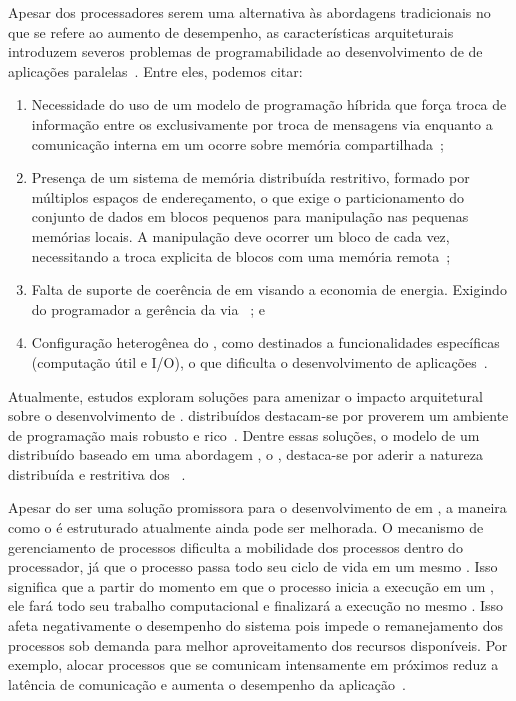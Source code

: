 Apesar dos processadores \lws serem uma alternativa às abordagens tradicionais no que se refere ao aumento de desempenho, as características arquiteturais introduzem severos problemas de programabilidade ao desenvolvimento de \software de aplicações paralelas~\cite{Castro-PARCO:2016}. Entre eles, podemos citar:

\begin{enumerate}[label= (\roman*)]
    \item Necessidade do uso de um modelo de programação híbrida que força troca de informação entre os \clusters exclusivamente por troca de mensagens via \noc enquanto a comunicação interna em um \cluster ocorre sobre memória compartilhada~\cite{kelly2013};
    \item Presença de um sistema de memória distribuída restritivo, formado por múltiplos espaços de endereçamento, o que exige o particionamento do conjunto de dados em blocos pequenos para manipulação nas pequenas memórias locais. A manipulação deve ocorrer um bloco de cada vez, necessitando a troca explicita de blocos com uma memória remota~\cite{Castro-PARCO:2016};
    \item Falta de suporte de coerência de \cache em \hardware visando a economia de energia. Exigindo do programador a gerência da \cache via \software~\cite{francesquini2015}; e
    \item Configuração heterogênea do \hardware, como \clusters destinados a funcionalidades específicas (computação útil e I/O), o que dificulta o desenvolvimento de aplicações~\cite{barbalace2015popcorn}.
\end{enumerate}

Atualmente, estudos exploram soluções para amenizar o impacto arquitetural sobre o desenvolvimento de \software. \oss distribuídos destacam-se por proverem um ambiente de programação mais robusto e rico~\cite{asmussen_m3:_2016, kluge_operating_2014, penna:sbesc19}. Dentre essas soluções, o modelo de um \os distribuído baseado em uma abordagem \multikernel, o \nanvix, destaca-se por aderir a natureza distribuída e restritiva dos \lws~\cite{penna2017-2,penna2019}.

Apesar do \nanvix ser uma solução promissora para o desenvolvimento de \software em \lws, a maneira como o \os é estruturado atualmente ainda pode ser melhorada. O mecanismo de gerenciamento de processos dificulta a mobilidade dos processos dentro do processador, já que o processo passa todo seu ciclo de vida em um mesmo \cluster. Isso significa que a partir do momento em que o processo inicia a execução em um \cluster, ele fará todo seu trabalho computacional e finalizará a execução no mesmo \cluster. Isso afeta negativamente o desempenho do sistema pois impede o remanejamento dos processos sob demanda para melhor aproveitamento dos recursos disponíveis. Por exemplo, alocar processos que se comunicam intensamente em \clusters próximos reduz a latência de comunicação e aumenta o desempenho da aplicação~\cite{vanz2022virtualizaccao}.

